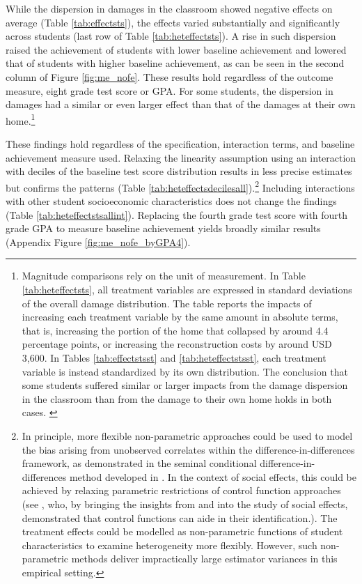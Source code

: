 While the dispersion in damages in the classroom showed negative effects on average (Table \ref{tab:effectsts}), the effects varied substantially and significantly across students (last row of Table \ref{tab:heteffectsts}). A rise in such dispersion raised the achievement of students with lower baseline achievement and lowered that of students with higher baseline achievement, as can be seen in the second column of Figure \ref{fig:me_nofe}. These results hold regardless of the outcome measure, eight grade test score or GPA. For some students, the dispersion in damages had a similar or even larger effect than that of the damages at their own home.\footnote{Magnitude comparisons rely on the unit of measurement. In Table \ref{tab:heteffectsts}, all treatment variables are expressed in standard deviations of the overall damage distribution. The table reports the impacts of increasing each treatment variable by the same amount in absolute terms, that is, increasing the portion of the home that collapsed by around 4.4 percentage points, or increasing the reconstruction costs by around USD 3,600. In Tables \ref{tab:effectstsst} and \ref{tab:heteffectstsst}, each treatment variable is instead standardized by its own distribution. The conclusion that some students suffered similar or larger impacts from the damage dispersion in the classroom than from the damage to their own home holds in both cases. \label{fn:magnitudecompar} }\par 


These findings hold regardless of the specification, interaction terms, and baseline achievement measure used. Relaxing the linearity assumption using an interaction with deciles of the baseline test score distribution results in less precise estimates but confirms the patterns (Table \ref{tab:heteffectsdecilesall}).\footnote{In principle, more flexible non-parametric approaches could be used to model the bias arising from unobserved correlates within the difference-in-differences framework, as demonstrated in the seminal conditional difference-in-differences method developed in \cite*{heckman1998characterizing}. In the context of social effects, this could be achieved by relaxing parametric restrictions of control function approaches (see \cite{brock2001interactions,durlauf2006multinomial}, who, by bringing the insights from \cite{heckman1979sample} and \cite{heckman1986alternative} into the study of social effects, demonstrated that control functions can aide in their identification.). The treatment effects could be modelled as non-parametric functions of student characteristics to examine heterogeneity more flexibly. However, such non-parametric methods deliver impractically large estimator variances in this empirical setting. } Including interactions with other student socioeconomic characteristics does not change the findings (Table \ref{tab:heteffectstsallint}). Replacing the fourth grade test score with fourth grade GPA to measure baseline achievement yields broadly similar results (Appendix Figure \ref{fig:me_nofe_byGPA4}).   \par



